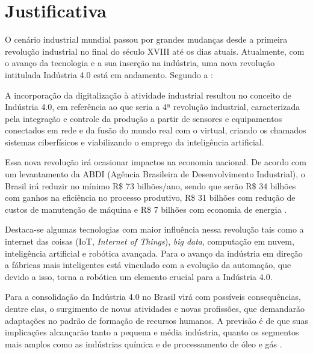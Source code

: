 \section{Justificativa}
\label{sec:justificativa}
O cenário industrial mundial passou por grandes mudanças desde a primeira revolução industrial no final do século XVIII até os dias atuais. Atualmente, com o avanço da tecnologia e a sua inserção na indústria, uma nova revolução intitulada Indústria 4.0 está em andamento. Segundo a :
\begin{quoting}[rightmargin=0cm,leftmargin=4cm]
\begin{singlespace}
{\footnotesize
A incorporação da digitalização à atividade industrial resultou no conceito de Indústria 4.0, em referência ao que seria a 4ª revolução industrial, caracterizada pela integração e controle da produção a partir de sensores e equipamentos conectados em rede e da fusão do mundo real com o virtual, criando os chamados sistemas ciberfísicos e viabilizando o emprego da inteligência artificial.
}
\end{singlespace}
\end{quoting}

Essa nova revolução irá ocasionar impactos na economia nacional. De acordo com um levantamento da ABDI (Agência Brasileira de Desenvolvimento Industrial), o Brasil irá reduzir no mínimo R\$ 73 bilhões/ano, sendo que serão R\$ 34 bilhões com ganhos na eficiência no processo produtivo, R\$ 31 bilhões com redução de custos de manutenção de máquina e  R\$ 7 bilhões com economia de energia \cite{abdi}.

Destaca-se algumas tecnologias com maior influência nessa revolução tais como a internet das coisas (IoT, \textit{Internet of Things}), \textit{big data}, computação em nuvem, inteligência artificial e robótica avançada. Para  o avanço da indústria em direção a fábricas mais inteligentes está vinculado com a evolução da automação, que devido a isso, torna a robótica um elemento crucial para a Indústria 4.0.

Para  a consolidação da Indústria 4.0 no Brasil virá com possíveis consequências, dentre elas, o surgimento de novas atividades e novas profissões, que demandarão adaptações no padrão de formação de recursos humanos. A previsão é de que suas implicações alcançarão tanto a pequena e média indústria, quanto os segmentos mais amplos como as indústrias química e de processamento de óleo e gás \cite{Gonzalez2018}.  

